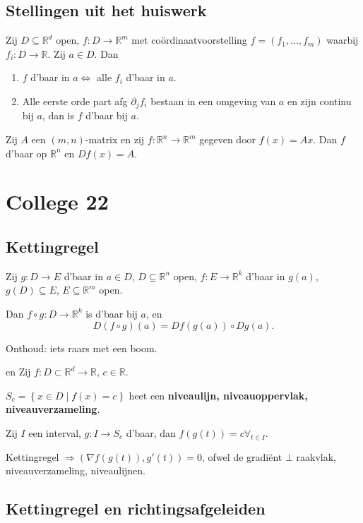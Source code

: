 \documentclass[a4paper]{exam}
\theoremstyle{definition}
\newcommand{\reals}{\mathbb{R}}
\begin{document}
		\subsection{Stellingen uit het huiswerk}
			\theorem Zij $ D \subseteq \mathbb{R}^d $ open, $ f: D \rightarrow \mathbb{R}^m $ met co\"ordinaatvoorstelling $ f=(f_1,\dots,f_m) $ waarbij $ f_i : D \rightarrow \mathbb{R} $. Zij $ a \in D $. Dan
			\begin{enumerate}[(1)]
				\item $ f $ d'baar in $ a \Leftrightarrow $ alle $ f_i $ d'baar in $ a $.
				\item Alle eerste orde part afg $ \partial_j f_i $ bestaan in een omgeving van $ a $ en zijn continu bij $ a $, dan is $ f $ d'baar bij $ a $.
			\end{enumerate}
			\theorem Zij $ A $ een $ (m,n) $-matrix en zij $ f:\mathbb{R}^n \rightarrow \mathbb{R}^m $ gegeven door $ f(x)=Ax $. Dan $ f $ d'baar op $ \mathbb{R}^n $ en $ Df(x) = A $.
			
	\newpage
	\section{College 22}
		\subsection{Kettingregel}
			\theorem Zij $g:D \to E$ d'baar in $a \in D$, $D \subseteq \reals^n$ open, $f:E \to \reals^k$ d'baar in $g(a)$, $g(D) \subseteq E$, $E \subseteq \reals^m$ open.
			
			Dan $f\circ g:D\to \reals^k$ is d'baar bij $a$, en \[ D(f \circ g)(a) = Df(g(a))\circ Dg(a). \]
			
			Onthoud: iets raars met een boom.
			
			\gevolg en  Zij $f:D \subset \reals^d \to \reals$, $c \in \reals$. 
			
			$S_c = \left\{ x\in D \middle| f(x)=c \right\}$ heet een \textbf{niveaulijn, niveauoppervlak, niveauverzameling}.
			
			Zij $I$ een interval, $g: I\to S_c$ d'baar, dan $f(g(t))=c \forall_{t \in I}$.
			
			\opm Kettingregel $\Rightarrow (\nabla f(g(t)),g'(t)) = 0$, ofwel de gradi\"ent $\bot$ raakvlak, niveauverzameling, niveaulijnen.
			
		\subsection{Kettingregel en richtingsafgeleiden}
			
\end{document}
